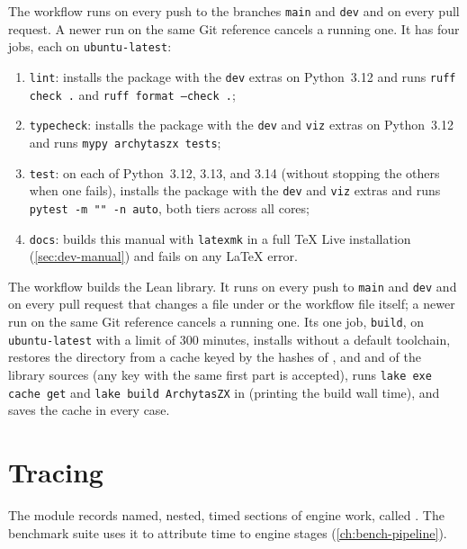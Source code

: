 The workflow  runs on every push to the branches \texttt{main} and \texttt{dev} and on every pull request. A newer run on the same Git reference cancels a running one. It has four jobs, each on \texttt{ubuntu-latest}:
\begin{enumerate}
\item \texttt{lint}: installs the package with the \texttt{dev} extras on Python~3.12 and runs \texttt{ruff check .} and \texttt{ruff format --check .};
\item \texttt{typecheck}: installs the package with the \texttt{dev} and \texttt{viz} extras on Python~3.12 and runs \texttt{mypy archytaszx tests};
\item \texttt{test}: on each of Python~3.12, 3.13, and 3.14 (without stopping the others when one fails), installs the package with the \texttt{dev} and \texttt{viz} extras and runs \texttt{pytest -m "" -n auto}, both tiers across all cores;
\item \texttt{docs}: builds this manual with \texttt{latexmk} in a full \TeX{} Live installation (\cref{sec:dev-manual}) and fails on any \LaTeX{} error.
\end{enumerate}
The workflow  builds the Lean library. It runs on every push to \texttt{main} and \texttt{dev} and on every pull request that changes a file under  or the workflow file itself; a newer run on the same Git reference cancels a running one. Its one job, \texttt{build}, on \texttt{ubuntu-latest} with a limit of 300 minutes, installs  without a default toolchain, restores the directory  from a cache keyed by the hashes of ,  and  and of the library sources (any key with the same first part is accepted), runs \texttt{lake exe cache get} and \texttt{lake build ArchytasZX} in  (printing the build wall time), and saves the cache in every case.

\section{Tracing}\label{sec:dev-trace}

The module  records named, nested, timed sections of engine work, called . The benchmark suite uses it to attribute time to engine stages (\cref{ch:bench-pipeline}).

